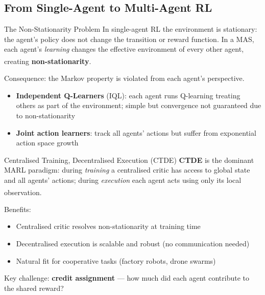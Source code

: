 \subsection{From Single-Agent to Multi-Agent RL}

\begin{v3topic}{The Non-Stationarity Problem}
    In single-agent RL the environment is stationary: the agent's policy
    does not change the transition or reward function.
    In a MAS, each agent's \emph{learning} changes the effective environment
    of every other agent, creating
    \textbf{non-stationarity}.\textsuperscript{\cite[][Ch.~17]{suttonReinforcementLearningIntroduction2018}}

    Consequence: the Markov property is violated from each agent's perspective.
    \begin{itemize}
        \item \textbf{Independent Q-Learners} (IQL): each agent runs Q-learning
              treating others as part of the environment; simple but convergence
              not guaranteed due to non-stationarity
        \item \textbf{Joint action learners}: track all agents' actions but suffer
              from exponential action space growth
    \end{itemize}

\end{v3topic}
\begin{v3topic}{Centralised Training, Decentralised Execution (CTDE)}
    \textbf{CTDE} is the dominant MARL paradigm:
    during \emph{training} a centralised critic has access to global state and
    all agents' actions; during \emph{execution} each agent acts using only
    its local observation.\textsuperscript{\cite[][p.~450]{weissMultiagentSystems2013}}

    Benefits:
    \begin{itemize}
        \item Centralised critic resolves non-stationarity at training time
        \item Decentralised execution is scalable and robust (no communication needed)
        \item Natural fit for cooperative tasks (factory robots, drone swarms)
    \end{itemize}
    Key challenge: \textbf{credit assignment} --- how much did each agent
    contribute to the shared reward?

\end{v3topic}

